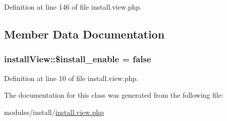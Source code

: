 Definition at line 146 of file install.\+view.\+php.



\subsection{Member Data Documentation}
\hypertarget{classinstallView_af8e64ea4a91e88a6539bef37e73d3a05}{
\subsubsection[{\$install\+\_\+enable}]{\setlength{\rightskip}{0pt plus 5cm}install\+View\+::\$install\+\_\+enable = false}}\label{classinstallView_af8e64ea4a91e88a6539bef37e73d3a05}


Definition at line 10 of file install.\+view.\+php.



The documentation for this class was generated from the following file\+:\begin{DoxyCompactItemize}
\item 
modules/install/\hyperlink{install_8view_8php}{install.\+view.\+php}\end{DoxyCompactItemize}
